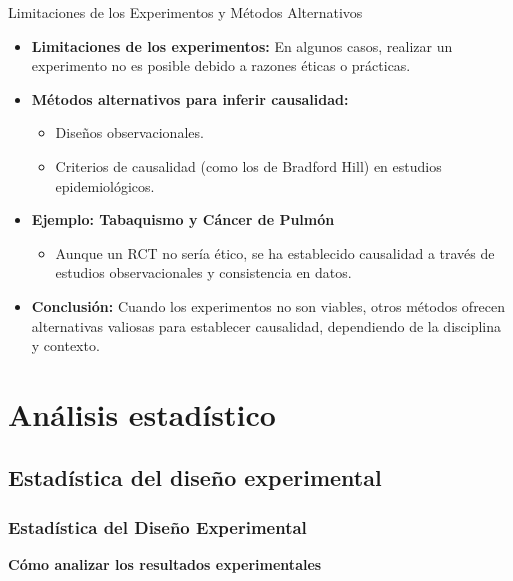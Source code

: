 ﻿\documentclass{beamer}
\begin{document}
\begin{frame}{Limitaciones de los Experimentos y Métodos Alternativos}
    \begin{itemize}
        \item \textbf{Limitaciones de los experimentos:} En algunos casos, realizar un experimento no es posible debido a razones éticas o prácticas.
        \item \textbf{Métodos alternativos para inferir causalidad:}
            \begin{itemize}
                \item Diseños observacionales.
                \item Criterios de causalidad (como los de Bradford Hill) en estudios epidemiológicos.
            \end{itemize}
        \item \textbf{Ejemplo: Tabaquismo y Cáncer de Pulmón}
            \begin{itemize}
                \item Aunque un RCT no sería ético, se ha establecido causalidad a través de estudios observacionales y consistencia en datos.
            \end{itemize}
        \item \textbf{Conclusión:} Cuando los experimentos no son viables, otros métodos ofrecen alternativas valiosas para establecer causalidad, dependiendo de la disciplina y contexto.
    \end{itemize}
\end{frame}

\section{Análisis estadístico}

\subsection{Estadística del diseño experimental}
\begin{frame}
    \frametitle{Estadística del Diseño Experimental}
    \centering
    \textbf{\Large Cómo analizar los resultados experimentales}
    \vspace{0.5cm}
\end{frame}
\end{document}
